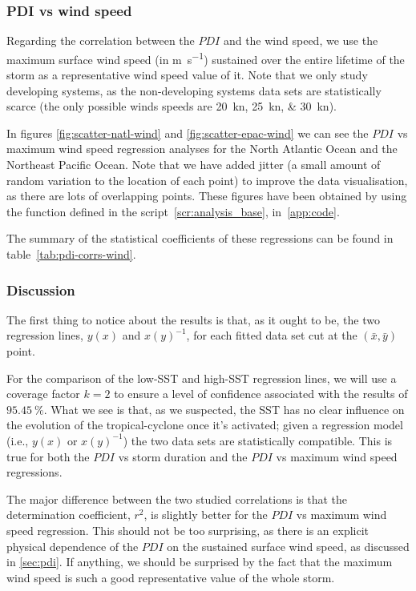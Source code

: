 \subsubsection*{PDI vs wind speed}
Regarding the correlation between the $PDI$ and the wind speed, we use the maximum
surface wind speed (in \si{\m\per\s}) sustained over the entire lifetime of the storm as a representative wind speed value of it. Note that we only study developing systems, as the non-developing systems data sets are statistically scarce (the only possible winds speeds are \SIlist[list-units = single]{20;25;30}{\knot}).

In figures \ref{fig:scatter-natl-wind} and \ref{fig:scatter-epac-wind} we can see the $PDI$ vs maximum wind speed regression analyses for the North Atlantic Ocean and the Northeast Pacific Ocean. Note that we have added jitter (a small amount of random variation to the location of each point) to improve the data visualisation, as there are lots of overlapping points. These figures have been obtained by using the  function defined in the script~\ref{scr:analysis_base}, in~\cref{app:code}.

The summary of the statistical coefficients of these regressions can be found in table~\ref{tab:pdi-corrs-wind}.


\subsubsection*{Discussion}
The first thing to notice about the results is that, as it ought to be, the two regression lines, $y(x)$ and $x(y)^{-1}$, for each fitted data set cut at the $(\bar{x}, \bar{y})$ point.

For the comparison of the low-SST and high-SST regression lines, we will use a coverage factor $k = 2 $ to ensure a level of confidence associated with the results of $\SI{95.45}{\percent}$. What we see is that, as we suspected, the SST has no clear influence on the evolution of the tropical-cyclone once it's activated; given a regression model (i.e., $y(x)$ or $x(y)^{-1}$) the two data sets are statistically compatible. This is true for both the $PDI$ vs storm duration and the $PDI$ vs maximum wind speed regressions.

The major difference between the two studied correlations is that the determination coefficient, $r^{2}$, is slightly better for the $PDI$ vs maximum wind speed regression. This should not be too surprising, as there is an explicit physical dependence of the $PDI$ on the sustained surface wind speed, as discussed in \cref{sec:pdi}. If anything, we should be surprised by the fact that the maximum wind speed is such a good representative value of the whole storm.

